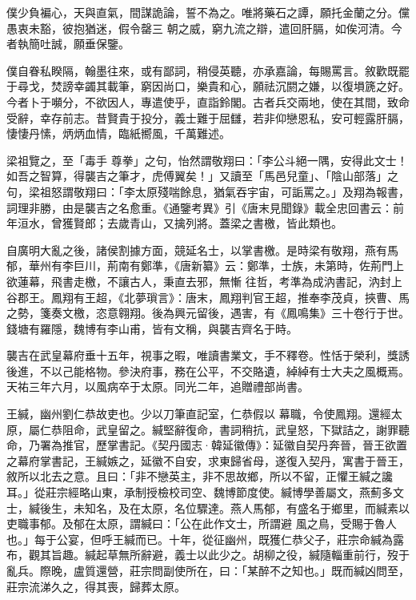 \begin{pinyinscope}
 僕少負褊心，天與直氣，間謀詭論，誓不為之。唯將藥石之譚，願托金蘭之分。儻愚衷未豁，彼抱猶迷，假令罄三
 朝之威，窮九流之辯，遣回肝膈，如俟河清。今者執簡吐誠，願垂保鑒。



 僕自眷私睽隔，翰墨往來，或有鄙詞，稍侵英聽，亦承嘉論，每賜罵言。敘歡既罷于尋戈，焚謗幸蠲其載筆，窮因尚口，樂貴和心，願祛沉閼之嫌，以復塤篪之好。今者卜于嚬分，不欲因人，專遣使乎，直詣鈴閣。古者兵交兩地，使在其間，致命受辭，幸存前志。昔賢貴于投分，義士難于屈讎，若非仰戀恩私，安可輕露肝膈，悽悽丹愫，炳炳血情，臨紙嚮風，千萬難述。



 梁祖覽之，至「毒手
 尊拳」之句，怡然謂敬翔曰：「李公斗絕一隅，安得此文士！如吾之智算，得襲吉之筆才，虎傅翼矣！」又讀至「馬邑兒童」、「陰山部落」之句，梁祖怒謂敬翔曰：「李太原殘喘餘息，猶氣吞宇宙，可詬罵之。」及翔為報書，詞理非勝，由是襲吉之名愈重。《通鑒考異》引《唐末見聞錄》載全忠回書云：前年洹水，曾獲賢郎；去歲青山，又擒列將。蓋梁之書檄，皆此類也。



 自廣明大亂之後，諸侯割據方面，競延名士，以掌書檄。是時梁有敬翔，燕有馬郁，華州有李巨川，荊南有鄭準，《唐新纂》云：鄭準，士族，未第時，佐荊門上欲蓮幕，飛書走檄，不讓古人，秉直去邪，無慚
 往哲，考準為成汭書記，汭封上谷郡王。鳳翔有王超，《北夢瑣言》：唐末，鳳翔判官王超，推奉李茂貞，挾曹、馬之勢，箋奏文檄，恣意翱翔。後為興元留後，遇害，有《鳳鳴集》三十卷行于世。錢塘有羅隱，魏博有李山甫，皆有文稱，與襲吉齊名于時。



 襲吉在武皇幕府垂十五年，視事之暇，唯讀書業文，手不釋卷。性恬于榮利，獎誘後進，不以己能格物。參決府事，務在公平，不交賂遺，綽綽有士大夫之風概焉。天祐三年六月，以風病卒于太原。同光二年，追贈禮部尚書。



 王緘，幽州劉仁恭故吏也。少以刀筆直記室，仁恭假以
 幕職，令使鳳翔。還經太原，屬仁恭阻命，武皇留之。緘堅辭復命，書詞稍抗，武皇怒，下獄詰之，謝罪聽命，乃署為推官，歷掌書記。《契丹國志·韓延徽傳》：延徽自契丹奔晉，晉王欲置之幕府掌書記，王緘嫉之，延徽不自安，求東歸省母，遂復入契丹，寓書于晉王，敘所以北去之意。且曰：「非不戀英主，非不思故鄉，所以不留，正懼王緘之讒耳。」從莊宗經略山東，承制授檢校司空、魏博節度使。緘博學善屬文，燕薊多文士，緘後生，未知名，及在太原，名位驟達。燕人馬郁，有盛名于鄉里，而緘素以吏職事郁。及郁在太原，謂緘曰：「公在此作文士，所謂避
 風之鳥，受賜于魯人也。」每于公宴，但呼王緘而已。十年，從征幽州，既獲仁恭父子，莊宗命緘為露布，觀其旨趣。緘起草無所辭避，義士以此少之。胡柳之役，緘隨輜重前行，歿于亂兵。際晚，盧質還營，莊宗問副使所在，曰：「某醉不之知也。」既而緘凶問至，莊宗流涕久之，得其喪，歸葬太原。




\end{pinyinscope}
